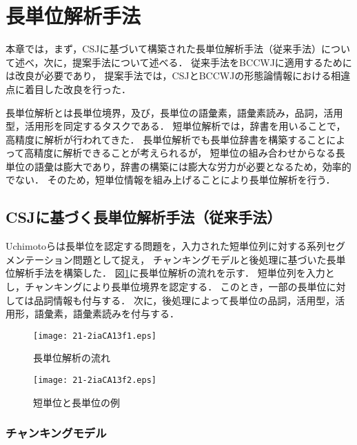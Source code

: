\documentclass[japanese]{jnlp_1.4}
\begin{document}
\section{長単位解析手法}
\label{luw_analysis}

本章では，まず，CSJに基づいて構築された長単位解析手法（従来手法）について述べ，次に，提案手法について述べる．
従来手法をBCCWJに適用するためには改良が必要であり，
提案手法では，CSJとBCCWJの形態論情報における相違点に着目した改良を行った．


長単位解析とは長単位境界，及び，長単位の語彙素，語彙素読み，品詞，活用型，活用形を同定するタスクである．
短単位解析では，辞書を用いることで，高精度に解析が行われてきた\cite{kudo,den}．
長単位解析でも長単位辞書を構築することによって高精度に解析できることが考えられるが，
短単位の組み合わせからなる長単位の語彙は膨大であり，辞書の構築には膨大な労力が必要となるため，効率的でない．
そのため，短単位情報を組み上げることにより長単位解析を行う．


\subsection{CSJに基づく長単位解析手法（従来手法）}
\label{uchimoto_method}

Uchimotoらは長単位を認定する問題を，入力された短単位列に対する系列セグメンテーション問題として捉え，
チャンキングモデルと後処理に基づいた長単位解析手法を構築した\cite{uchimoto2007}．
図\ref{flow}に長単位解析の流れを示す．
短単位列を入力とし，チャンキングにより長単位境界を認定する．
このとき，一部の長単位に対しては品詞情報も付与する．
次に，後処理によって長単位の品詞，活用型，活用形，語彙素，語彙素読みを付与する．

\begin{figure}[b]
\begin{center}
\texttt{[image: 21-2iaCA13f1.eps]}
\end{center}
\caption{長単位解析の流れ}
\label{flow}
\end{figure}
\begin{figure}[b]
\begin{center}
\texttt{[image: 21-2iaCA13f2.eps]}
\end{center}
\caption{短単位と長単位の例}
\label{fig:suw_luw_org}
\vspace*{-2\Cvs}
\end{figure}



\subsubsection{チャンキングモデル}
\label{chunking_model}
\end{document}
